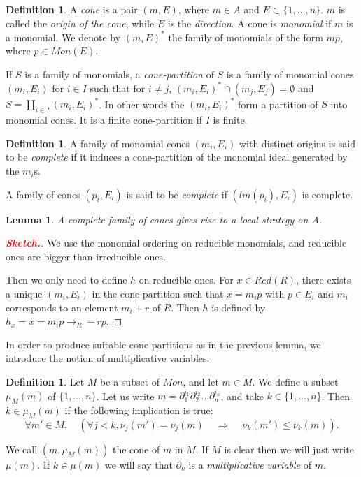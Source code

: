 \documentclass[10pt]{easychair}
\newtheorem{lemma}[theorem]{Lemma}
\theoremstyle{definition}
\newtheorem{definition}[theorem]{Definition}
\newcommand\todo[1]{{\bf\textcolor{red}{#1.}}}
\newcommand\rewR{\to_R}
\begin{document}
\begin{definition}
  A \emph{cone} is a pair $(m,E)$, where $m \in A$ and $E \subset \{1,\ldots,n\}$. $m$ is called the \emph{origin of the cone}, while $E$ is the \emph{direction}. A cone is \emph{monomial} if $m$ is a monomial. We denote by $(m,E)^*$ the family of monomials of the form $mp$, where $p \in Mon(E)$.

  If $S$ is a family of monomials, a \emph{cone-partition} of $S$ is a family of monomial cones $(m_i,E_i)$ for $i \in I$ such that for $i \neq j$, $(m_i,E_i)^* \cap (m_j,E_j) = \emptyset$ and $S = \coprod_{i \in I} (m_i,E_i)^*$. In other words the $(m_i,E_i)^*$ form a partition of $S$ into monomial cones. It is a finite cone-partition if $I$ is finite.
\end{definition}


 \begin{definition}
   A family of monomial cones $(m_i,E_i)$ with distinct origins is said to be \emph{complete} if it induces a cone-partition of the monomial ideal generated by the $m_i$s. 

   A family of cones $(p_i,E_i)$ is said to be \emph{complete} if $(lm(p_i),E_i)$ is complete. 
 \end{definition}

 \begin{lemma}
  A complete family of cones gives rise to a local strategy on $A$. 
\end{lemma}
\begin{proof}[\todo{Sketch}]
  We use the monomial ordering on reducible monomials, and reducible ones are bigger than irreducible ones.

  Then we only need to define $h$ on reducible ones. For $x \in Red(R)$, there exists a unique $(m_i,E_i)$ in the cone-partition such that $x=m_i p$ with $p \in E_i$ and $m_i$ corresponds to an element $m_i + r$ of $R$. Then $h$ is defined by $h_x = x = m_ip  \rewR -rp$.
\end{proof}


In order to produce suitable cone-partitions as in the previous lemma, we introduce the notion of multiplicative variables.

\begin{definition}
  Let $M$ be a subset of $Mon$, and let $m  \in M$. We define a subset $\mu_M(m)$ of $\{1,\ldots,n\}$. Let us write $m = \partial_1^{i_1}\partial_2^{i_2}\ldots \partial_n^{i_n}$, and take $k \in \{1,\ldots,n\}$. Then $k \in \mu_M(m)$ if the following implication is true:
  \[
\forall m' \in M, \quad (\forall j < k, \nu_j(m') = \nu_j(m) \, \quad \Rightarrow \quad \, \nu_k(m') \leq \nu_k(m)).
  \]
  

  We call $(m,\mu_M(m))$ the cone of $m$ in $M$. If $M$ is clear then we will just write $\mu(m)$. If $k \in \mu(m)$ we will say that $\partial_k$ is a \emph{multiplicative variable} of $m$.
\end{definition}
\end{document}
